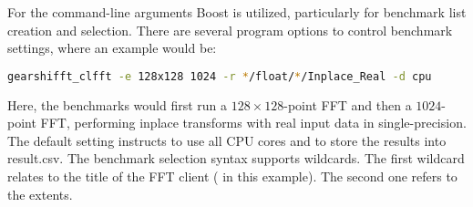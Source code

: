 For the command-line arguments Boost is utilized, particularly for benchmark list creation and selection.
There are several \gearshifft{} program options to control benchmark settings, where an example would be:
\begin{lstlisting}[language=bash]
gearshifft_clfft -e 128x128 1024 -r */float/*/Inplace_Real -d cpu
\end{lstlisting}
Here, the \clfft{} benchmarks would first run a $128{\times}128$-point FFT and then a $1024$-point FFT, performing inplace transforms with real input data in single-precision. The default setting instructs \gearshifft{} to use all CPU cores and to store the results into result.csv. The \gearshifft{} benchmark selection syntax supports wildcards. The first wildcard \mc{*} relates to the title of the FFT client ( in this example). The second one refers to the extents.
